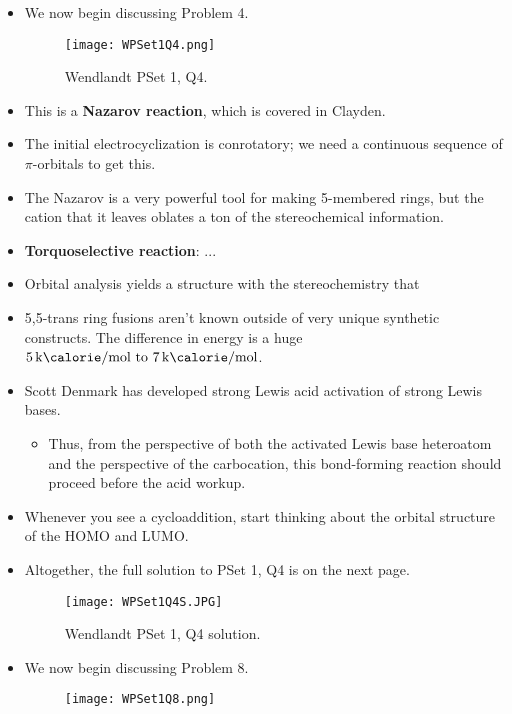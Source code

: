 \documentclass[../notes.tex]{subfiles}
\begin{document}
\begin{itemize}
\begin{figure}[H]
        \label{fig:WPSet1Q1S}
    \end{figure}
    \pagebreak
    \item We now begin discussing Problem 4.
    \begin{figure}[h!]
        \centering
        \texttt{[image: WPSet1Q4.png]}
        \caption{Wendlandt PSet 1, Q4.}
        \label{fig:WPSet1Q4}
    \end{figure}
    \item This is a \textbf{Nazarov reaction}, which is covered in Clayden.
    \item The initial electrocyclization is conrotatory; we need a continuous sequence of $\pi$-orbitals to get this.
    \item The Nazarov is a very powerful tool for making 5-membered rings, but the cation that it leaves oblates a ton of the stereochemical information.
    \item \textbf{Torquoselective reaction}: ...
    \item Orbital analysis yields a structure with the stereochemistry that 
    \item 5,5-trans ring fusions aren't known outside of very unique synthetic constructs. The difference in energy is a huge $\SIrange{5}{7}{\kilo\calorie\per\mole}$.
    \item Scott Denmark has developed strong Lewis acid activation of strong Lewis bases.
    \begin{itemize}
        \item Thus, from the perspective of both the activated Lewis base heteroatom and the perspective of the carbocation, this  bond-forming reaction should proceed before the acid workup.
    \end{itemize}
    \item Whenever you see a cycloaddition, start thinking about the orbital structure of the HOMO and LUMO.
    \item Altogether, the full solution to PSet 1, Q4 is on the next page.
    \begin{figure}[H]
        \centering
        \texttt{[image: WPSet1Q4S.JPG]}
        \caption{Wendlandt PSet 1, Q4 solution.}
        \label{fig:WPSet1Q4S}
    \end{figure}
    \pagebreak
    \item We now begin discussing Problem 8.
    \begin{figure}[h!]
        \centering
        \texttt{[image: WPSet1Q8.png]}

\end{figure}
\end{itemize}
\end{document}
